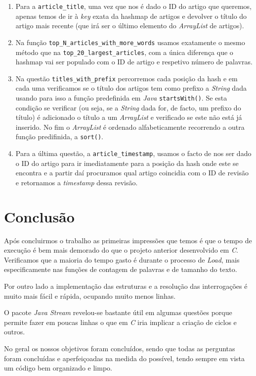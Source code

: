 \documentclass[a4paper,12pt]{report}
\begin{document}
\begin{enumerate}
	\item Para a {\tt{}\selectfont article\_title}, uma vez que nos é dado o ID do artigo que queremos, apenas temos de ir à {\sl key} exata da hashmap de artigos e devolver o título do artigo mais recente (que irá ser o último elemento do {\sl ArrayList} de artigos).
	
	\item Na função {\tt{}\selectfont top\_N\_articles\_with\_more\_words} usamos exatamente o mesmo método que na {\tt top\_20\_largest\_articles}, com a única diferença que o hashmap vai ser populado com o ID de artigo e respetivo número de palavras.
	
	\item Na questão {\tt{}\selectfont titles\_with\_prefix} percorremos cada posição da hash e em cada uma verificamos se o título dos artigos tem como prefixo a {\sl String} dada usando para isso a função predefinida em {\sl Java} {\tt startsWith()}. Se esta condição se verificar (ou seja, se a {\sl String} dada for, de facto, um prefixo do título) é adicionado o título a um {\sl ArrayList} e verificado se este não está já inserido. No fim o {\sl ArrayList} é ordenado alfabeticamente recorrendo a outra função predifinida, a {\tt sort()}.
	
	\item Para a última questão, a {\tt{}\selectfont article\_timestamp}, usamos o facto de nos ser dado o ID do artigo para ir imediatamente para a posição da hash onde este se encontra e a partir daí procuramos qual artigo coincidia com o ID de revisão e retornamos a {\sl timestamp} dessa revisão.
\end{enumerate}




\chapter {Conclusão}

Após concluirmos o trabalho as primeiras impressões que temos é que o tempo de execução é bem mais demorado do que o projeto anterior desenvolvido em {\sl C}. Verificamos que a maioria do tempo gasto é durante o processo de {\sl Load}, mais especificamente nas funções de contagem de palavras e de tamanho do texto.

Por outro lado a implementação das estruturas e a resolução das interrogações é muito mais fácil e rápida, ocupando muito menos linhas.

O pacote {\sl Java Stream} revelou-se bastante útil em algumas questões porque permite fazer em poucas linhas o que em {\sl C} iria implicar a criação de ciclos e outros.

No geral os nossos objetivos foram concluídos, sendo que todas as perguntas foram concluídas e aperfeiçoadas na medida do possível, tendo sempre em vista um código bem organizado e limpo.
\end{document}
